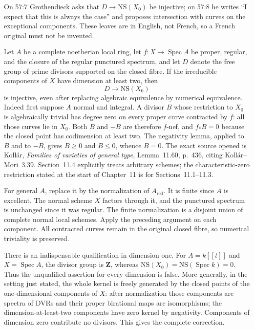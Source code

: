 On 57:7 Grothendieck asks that $D\to\mathrm{NS}(X_0)$ be injective; on 57:8
he writes ``I expect that this is always the case'' and proposes intersection
with curves on the exceptional components. These leaves are in English, not
French, so a French original must not be invented.

Let $A$ be a complete noetherian local ring, let
$f:X\to\operatorname{Spec}A$ be proper, regular, and the closure of the
regular punctured spectrum, and let $D$ denote the free group of prime
divisors supported on the closed fibre. If the irreducible components of
$X$ have dimension at least two, then
\[
 D\longrightarrow\mathrm{NS}(X_0)
\]
is injective, even after replacing algebraic equivalence by numerical
equivalence. Indeed first suppose $A$ normal and integral. A divisor $B$
whose restriction to $X_0$ is algebraically trivial has degree zero on every
proper curve contracted by $f$: all those curves lie in $X_0$. Both $B$ and
$-B$ are therefore $f$-nef, and $f_*B=0$ because the closed point has
codimension at least two. The negativity lemma, applied to $B$ and to $-B$,
gives $B\geq0$ and $B\leq0$, whence $B=0$.
The exact source opened is Koll\'ar, \emph{Families of varieties of general
type}, Lemma~11.60, p.~436, citing Koll\'ar--Mori~3.39. Section~11.4 explicitly
treats arbitrary schemes; the characteristic-zero restriction stated at the
start of Chapter~11 is for Sections~11.1--11.3.

For general $A$, replace it by the normalization of $A_{\mathrm{red}}$.
It is finite since $A$ is excellent. The normal scheme $X$ factors through
it, and the punctured spectrum is unchanged since it was regular. The finite
normalization is a disjoint union of complete normal local schemes. Apply the
preceding argument on each component. All contracted curves remain in the
original closed fibre, so numerical triviality is preserved.

There is an indispensable qualification in dimension one. For
$A=k[[t]]$ and $X=\operatorname{Spec}A$, the divisor group is $\mathbf Z$,
whereas $\mathrm{NS}(X_0)=\mathrm{NS}(\operatorname{Spec}k)=0$. Thus the
unqualified assertion for every dimension is false. More generally, in the
setting just stated, the whole kernel is freely generated by the closed points
of the one-dimensional components of $X$: after normalization those components
are spectra of DVRs and their proper birational maps are isomorphisms; the
dimension-at-least-two components have zero kernel by negativity. Components
of dimension zero contribute no divisors. This gives the complete correction.

